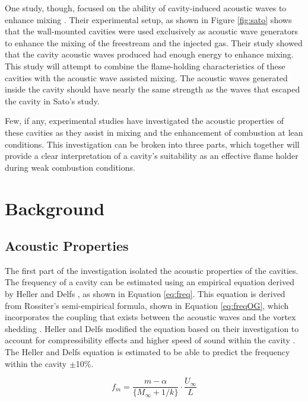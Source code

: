 One study, though, focused on the ability of cavity-induced acoustic waves to enhance mixing \cite{sato1999advanced}. Their experimental setup, as shown in Figure \ref{fig:sato} shows that the wall-mounted cavities were used exclusively as acoustic wave generators to enhance the mixing of the freestream and the injected gas. Their study showed that the cavity acoustic waves produced had enough energy to enhance mixing. This study will attempt to combine the flame-holding characteristics of these cavities with the acoustic wave assisted mixing. The acoustic waves generated inside the cavity should have nearly the same strength as the waves that escaped the cavity in Sato's study. 

Few, if any, experimental studies have investigated the acoustic properties of these cavities as they assist in mixing and the enhancement of combustion at lean conditions. This investigation can be broken into three parts, which together will provide a clear interpretation of a cavity's suitability as an effective flame holder during weak combustion conditions. 


\section{Background}

\subsection{Acoustic Properties}

The first part of the investigation isolated the acoustic properties of the cavities. The frequency of a cavity can be estimated using an empirical equation derived by Heller and Delfs \cite{heller1996letter}, as shown in Equation \ref{eq:freq}. This equation is derived from Rossiter's semi-empirical formula, shown in Equation \ref{eq:freqOG}, which incorporates the coupling that exists between the acoustic waves and the vortex shedding \cite{rossiter1964wind}. Heller and Delfs modified the equation based on their investigation to account for compressibility effects and higher speed of sound within the cavity \cite{ben2001cavity}. The Heller and Delfs equation is estimated to be able to predict the frequency within the cavity $\pm$10\%\cite{heller1996letter}.

\begin{equation}
f_m = \frac{m-\alpha}{\{M_{\infty}+1/k\}} \cdot \frac{U_\infty}{L}
\label{eq:freqOG}
\end{equation}


